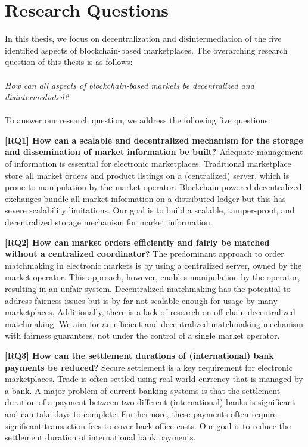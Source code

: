 \section{Research Questions}
\label{sec:research_questions}
In this thesis, we focus on decentralization and disintermediation of the five identified aspects of blockchain-based marketplaces.
The overarching research question of this thesis is as follows:\\\\
\emph{How can all aspects of blockchain-based markets be decentralized and disintermediated?}\\\\
To answer our research question, we address the following five questions:

\textbf{[RQ1] How can a scalable and decentralized mechanism for the storage and dissemination of market information be built?}
Adequate management of information is essential for electronic marketplaces.
Traditional marketplace store all market orders and product listings on a (centralized) server, which is prone to manipulation by the market operator.
Blockchain-powered decentralized exchanges bundle all market information on a distributed ledger but this has severe scalability limitations.
Our goal is to build a scalable, tamper-proof, and decentralized storage mechanism for market information.

\textbf{[RQ2] How can market orders efficiently and fairly be matched without a centralized coordinator?}
The predominant approach to order matchmaking in electronic markets is by using a centralized server, owned by the market operator.
This approach, however, enables manipulation by the operator, resulting in an unfair system.
Decentralized matchmaking has the potential to address fairness issues but is by far not scalable enough for usage by many marketplaces.
Additionally, there is a lack of research on off-chain decentralized matchmaking.
We aim for an efficient and decentralized matchmaking mechanism with fairness guarantees, not under the control of a single market operator.

\textbf{[RQ3] How can the settlement durations of (international) bank payments be reduced?}
Secure settlement is a key requirement for electronic marketplaces.
Trade is often settled using real-world currency that is managed by a bank.
A major problem of current banking systems is that the settlement duration of a payment between two different (international) banks is significant and can take days to complete.
Furthermore, these payments often require significant transaction fees to cover back-office costs.
Our goal is to reduce the settlement duration of international bank payments.

